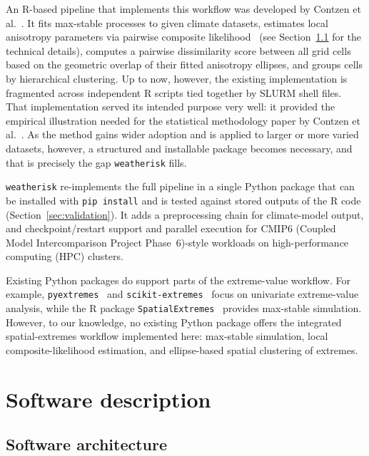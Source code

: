 \documentclass[preprint,12pt,a4paper]{elsarticle}
\newcommand{\revo}[1]{{#1}}
\newcommand{\revr}[1]{{#1}}
\newcommand{\revt}[1]{{#1}}
\begin{document}
An R-based pipeline that implements this workflow was developed
by Contzen et al.~\cite{contzen2025}. It \revt{fits max-stable processes to given
climate datasets},
estimates local anisotropy parameters via pairwise composite
likelihood~\cite{padoan2010} \revr{(see Section~\ref{sec:architecture} for the
technical details)}, computes a pairwise dissimilarity score between
all grid cells based on the geometric overlap of their fitted
anisotropy ellipses, and \revt{groups} cells by hierarchical clustering. \revt{Up
to now, however, the existing} implementation is fragmented across independent
R scripts tied together by SLURM shell files\revt{. That implementation
served its intended purpose very well: it provided the empirical
illustration needed for the statistical methodology paper by Contzen
et al.~\cite{contzen2025}. As the method gains wider adoption and is applied to
larger or more varied datasets, however, a structured and installable
package becomes necessary, and that is precisely the gap
\texttt{weatherisk} fills.}

\texttt{weatherisk} re-implements the full pipeline in a single
Python package that can be installed with \texttt{pip install} and is
tested against stored outputs of the R code
(Section~\ref{sec:validation}). It adds a preprocessing chain for
climate-model output, and checkpoint/restart support and parallel
execution for CMIP6\revo{ (Coupled Model Intercomparison
Project Phase~6)}-style workloads on high-performance computing (HPC)
clusters.

Existing Python packages do support parts of the extreme-value workflow.
For example, \texttt{pyextremes}~\cite{pyextremes} and
\texttt{scikit-extremes}~\cite{scikitextremes}
focus on univariate extreme-value analysis, while the R package
\texttt{SpatialExtremes}~\cite{spatialextremes} provides max-stable simulation.
However, to our knowledge, no existing Python package offers the
integrated spatial-extremes workflow implemented here: max-stable
simulation, local composite-likelihood estimation, and ellipse-based
spatial clustering of extremes.

\section{Software description}
\label{sec:description}

\subsection{Software architecture}
\label{sec:architecture}
\end{document}
